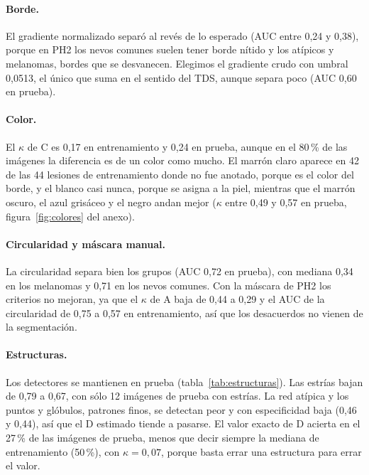 \paragraph{Borde.} El gradiente normalizado separó al revés de lo esperado (AUC entre 0,24 y 0,38), porque en PH2 los nevos comunes suelen tener borde nítido y los atípicos y melanomas, bordes que se desvanecen. Elegimos el gradiente crudo con umbral 0,0513, el único que suma en el sentido del TDS, aunque separa poco (AUC 0,60 en prueba).

\paragraph{Color.} El $\kappa$ de C es 0,17 en entrenamiento y 0,24 en prueba, aunque en el 80\,\% de las imágenes la diferencia es de un color como mucho. El marrón claro aparece en 42 de las 44 lesiones de entrenamiento donde no fue anotado, porque es el color del borde, y el blanco casi nunca, porque se asigna a la piel, mientras que el marrón oscuro, el azul grisáceo y el negro andan mejor ($\kappa$ entre 0,49 y 0,57 en prueba, figura~\ref{fig:colores} del anexo).

\paragraph{Circularidad y máscara manual.} La circularidad separa bien los grupos (AUC 0,72 en prueba), con mediana 0,34 en los melanomas y 0,71 en los nevos comunes. Con la máscara de PH2 los criterios no mejoran, ya que el $\kappa$ de A baja de 0,44 a 0,29 y el AUC de la circularidad de 0,75 a 0,57 en entrenamiento, así que los desacuerdos no vienen de la segmentación.

\paragraph{Estructuras.} Los detectores se mantienen en prueba (tabla~\ref{tab:estructuras}). Las estrías bajan de 0,79 a 0,67, con sólo 12 imágenes de prueba con estrías. La red atípica y los puntos y glóbulos, patrones finos, se detectan peor y con especificidad baja (0,46 y 0,44), así que el D estimado tiende a pasarse. El valor exacto de D acierta en el 27\,\% de las imágenes de prueba, menos que decir siempre la mediana de entrenamiento (50\,\%), con $\kappa=0{,}07$, porque basta errar una estructura para errar el valor.

